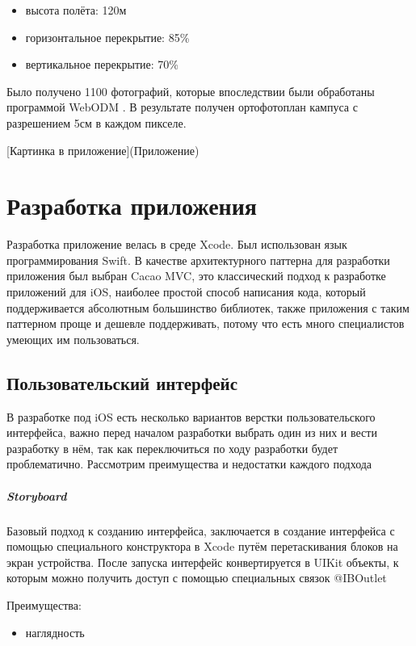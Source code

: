       \begin{itemize}
        \item высота полёта: 120м
        \item горизонтальное перекрытие: 85\%
        \item вертикальное перекрытие: 70\%
      \end{itemize}

      Было получено 1100 фотографий, которые впоследствии были обработаны программой WebODM \cite{WebODM}. В результате получен ортофотоплан кампуса с разрешением 5см в каждом пикселе.

      [Картинка в приложение](Приложение)

\chapter{Разработка приложения}
  Разработка приложение велась в среде Xcode. Был использован язык программирования Swift. В качестве архитектурного паттерна для разработки приложения был выбран Cacao MVC, это классический подход к разработке приложений для iOS, наиболее простой способ написания кода, который поддерживается абсолютным большинство библиотек, также приложения с таким паттерном проще и дешевле поддерживать, потому что есть много специалистов умеющих им пользоваться.

  \section{Пользовательский интерфейс}
    В разработке под iOS есть несколько вариантов верстки пользовательского интерфейса, важно перед началом разработки выбрать один из них и вести разработку в нём, так как переключиться по ходу разработки будет проблематично. Рассмотрим преимущества и недостатки каждого подхода

    \paragraph{Storyboard}
      Базовый подход к созданию интерфейса, заключается в создание интерфейса с помощью специального конструктора в Xcode путём перетаскивания блоков на экран устройства. После запуска интерфейс конвертируется в UIKit объекты, к которым можно получить доступ с помощью специальных связок @IBOutlet

      \noindent Преимущества:
      \begin{itemize}
        \item наглядность
      \end{itemize}

